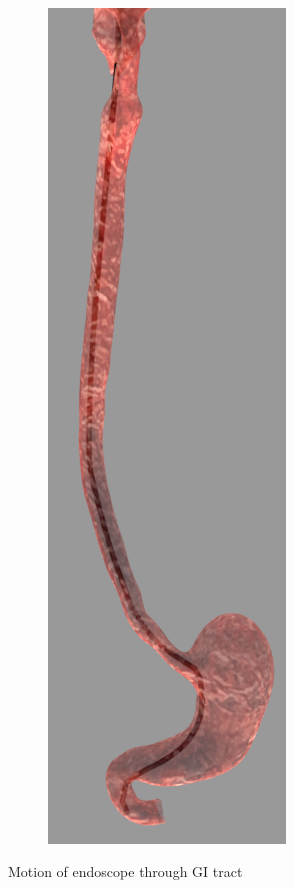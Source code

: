 \documentclass[12pt,a4]{article}
\begin{document}
\begin{figure}[ht!]
\begin{subfigure}{0.15\textwidth}
    \end{subfigure}%
    ~
        \begin{subfigure}{0.15\textwidth}
        \centering
        \includegraphics[width=0.6\linewidth]{figures/GIsnaps/6.png}
        
    \end{subfigure}%
    
    \caption{ Motion of endoscope through GI tract}
\end{figure}
\end{document}
